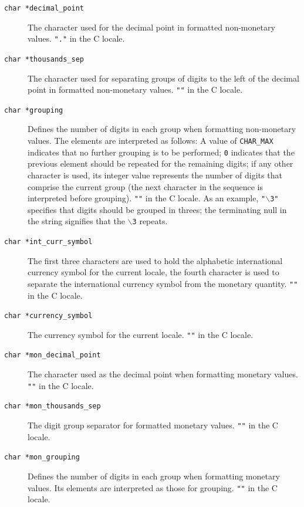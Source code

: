   \begin{description}
   \item[\texttt{char *decimal\_point}] The character used for the  decimal  point  in  formatted
    non-monetary values.  \texttt{"."} in the C locale.

   \item[\texttt{char *thousands\_sep}] The character used for separating groups of digits to the
    left  of  the  decimal  point  in  formatted non-monetary
    values. \texttt{""} in the C locale.

   \item[\texttt{char *grouping}] Defines  the  number  of  digits  in  each   group   when
    formatting   non-monetary   values.    The  elements  are
    interpreted as follows: A  value  of  \texttt{CHAR\_MAX}  indicates
    that  no further grouping is to be performed; \texttt{0} indicates
    that the previous element  should  be  repeated  for  the
    remaining  digits;  if  any  other character is used, its
    integer  value  represents  the  number  of  digits  that
    comprise  the  current  group  (the next character in the
    sequence is interpreted before grouping).  \texttt{""}  in  the  C
    locale.  As an example, \texttt{"$\backslash$3"} specifies that digits should
    be grouped in threes; the terminating null in the  string
    signifies that the \texttt{$\backslash$3} repeats.

   \item[\texttt{char *int\_curr\_symbol}] The  first  three  characters  are  used  to   hold   the
    alphabetic  international currency symbol for the current
    locale, the fourth character  is  used  to  separate  the
    international currency symbol from the monetary quantity.
    \texttt{""} in the C locale.

   \item[\texttt{char *currency\_symbol}] The currency symbol for the current locale. \texttt{""} in  the  C
    locale.

   \item[\texttt{char *mon\_decimal\_point}] The character used as the decimal point  when  formatting
    monetary values.  \texttt{""} in the C locale.

   \item[\texttt{char *mon\_thousands\_sep}] The digit group separator for formatted monetary  values.
    \texttt{""} in the C locale.

   \item[\texttt{char *mon\_grouping}] Defines  the  number  of  digits  in  each   group   when
    formatting monetary values.  Its elements are interpreted
    as those for grouping.  \texttt{""} in the C locale.


\end{description}
